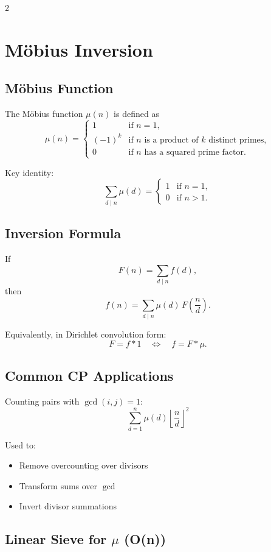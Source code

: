 \documentclass[a4paper,landscape]{article}
\begin{document}
\begin{multicols}{2}
\section*{Möbius Inversion}
\hline
\subsection*{Möbius Function}

The Möbius function $\mu(n)$ is defined as
\[
\mu(n)=
\begin{cases}
1 & \text{if } n=1, \\
(-1)^k & \text{if } n \text{ is a product of } k \text{ distinct primes}, \\
0 & \text{if } n \text{ has a squared prime factor}.
\end{cases}
\]

Key identity:
\[
\sum_{d \mid n} \mu(d) =
\begin{cases}
1 & \text{if } n=1, \\
0 & \text{if } n>1.
\end{cases}
\]
\subsection*{Inversion Formula}

If
\[
F(n) = \sum_{d \mid n} f(d),
\]
then
\[
f(n) = \sum_{d \mid n} \mu(d)\,F\!\left(\frac{n}{d}\right).
\]

Equivalently, in Dirichlet convolution form:
\[
F = f * 1
\quad \Longleftrightarrow \quad
f = F * \mu.
\]

\subsection*{Common CP Applications}

Counting pairs with $\gcd(i,j)=1$:
\[
\sum_{d=1}^{n}
\mu(d)
\left\lfloor \frac{n}{d} \right\rfloor^2
\]

Used to:
\begin{itemize}
    \item Remove overcounting over divisors
    \item Transform sums over $\gcd$
    \item Invert divisor summations
\end{itemize}
\subsection*{Linear Sieve for $\mu$ (O(n))}


\end{multicols}
\end{document}
